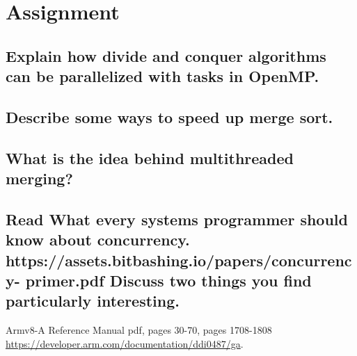 \documentclass[runningheads]{llncs}
\begin{document}
\section{Assignment}

\subsection{Explain how divide and conquer algorithms can be parallelized with tasks in OpenMP.}
\subsection{Describe some ways to speed up merge sort.}
\subsection{What is the idea behind multithreaded merging?}
\subsection{Read What every systems programmer should know about concurrency. https://assets.bitbashing.io/papers/concurrency- primer.pdf
Discuss two things you find particularly interesting.}

%
%
%
% 
% 
%
\begin{thebibliography}{8}

Armv8-A Reference Manual pdf, pages 30-70, pages 1708-1808 \\ \url{https://developer.arm.com/documentation/ddi0487/ga}.

\end{thebibliography}
\end{document}
